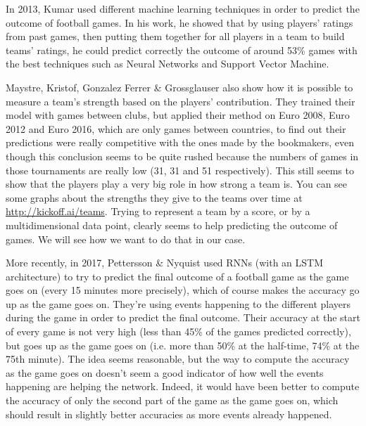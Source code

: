 \documentclass[10pt,conference,onecolumn]{IEEEtran}
\begin{document}
In 2013, Kumar \cite{ml_kumar} used different machine learning techniques in order to predict the outcome of football games. In his work, he showed that by using players' ratings from past games, then putting them together for all players in a team to build teams' ratings, he could predict correctly the outcome of around 53\% games with the best techniques such as Neural Networks and Support Vector Machine.

Maystre, Kristof, Gonzalez Ferrer \& Grossglauser \cite{Maystre:221151} also show how it is possible to measure a team's strength based on the players' contribution. They trained their model with games between clubs, but applied their method on Euro 2008, Euro 2012 and Euro 2016, which are only games between countries, to find out their predictions were really competitive with the ones made by the bookmakers, even though this conclusion seems to be quite rushed because the numbers of games in those tournaments are really low (31, 31 and 51 respectively). This still seems to show that the players play a very big role in how strong a team is. You can see some graphs about the strengths they give to the teams over time at \url{http://kickoff.ai/teams}. Trying to represent a team by a score, or by a multidimensional data point, clearly seems to help predicting the outcome of games. We will see how we want to do that in our case.

More recently, in 2017, Pettersson \& Nyquist \cite{rnn_players_prediction} used RNNs (with an LSTM architecture) to try to predict the final outcome of a football game as the game goes on (every 15 minutes more precisely), which of course makes the accuracy go up as the game goes on. They're using events happening to the different players during the game in order to predict the final outcome. Their accuracy at the start of every game is not very high (less than 45\% of the games predicted correctly), but goes up as the game goes on (i.e. more than 50\% at the half-time, 74\% at the 75th minute). The idea seems reasonable, but the way to compute the accuracy as the game goes on doesn't seem a good indicator of how well the events happening are helping the network. Indeed, it would have been better to compute the accuracy of only the second part of the game as the game goes on, which should result in slightly better accuracies as more events already happened.
\end{document}
